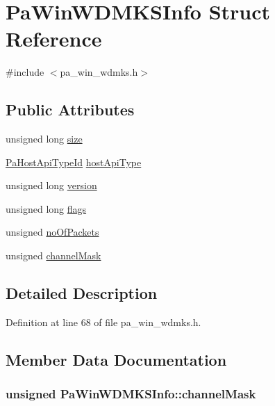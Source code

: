 \hypertarget{struct_pa_win_w_d_m_k_s_info}{}\section{Pa\+Win\+W\+D\+M\+K\+S\+Info Struct Reference}
\label{struct_pa_win_w_d_m_k_s_info}


{\ttfamily \#include $<$pa\+\_\+win\+\_\+wdmks.\+h$>$}

\subsection*{Public Attributes}
\begin{DoxyCompactItemize}
\item 
unsigned long \hyperlink{struct_pa_win_w_d_m_k_s_info_a550f4ab63732471599e64a2961a63125}{size}
\item 
\hyperlink{portaudio_8h_a8eaebe3d39c5ea45598da8f86dc2e5ae}{Pa\+Host\+Api\+Type\+Id} \hyperlink{struct_pa_win_w_d_m_k_s_info_a28bff7039063cc48ebab4e13cd1bf3c7}{host\+Api\+Type}
\item 
unsigned long \hyperlink{struct_pa_win_w_d_m_k_s_info_a17221c5458a73c0295dff5cef739eb7d}{version}
\item 
unsigned long \hyperlink{struct_pa_win_w_d_m_k_s_info_a2c46387aee219e1499120b056d74e94d}{flags}
\item 
unsigned \hyperlink{struct_pa_win_w_d_m_k_s_info_af1a2e073583ac238a60f1acbee470e28}{no\+Of\+Packets}
\item 
unsigned \hyperlink{struct_pa_win_w_d_m_k_s_info_a07cee1fc3c28bbf431672040b4256f5c}{channel\+Mask}
\end{DoxyCompactItemize}


\subsection{Detailed Description}


Definition at line 68 of file pa\+\_\+win\+\_\+wdmks.\+h.



\subsection{Member Data Documentation}
\subsubsection[{\texorpdfstring{channel\+Mask}{channelMask}}]{\setlength{\rightskip}{0pt plus 5cm}unsigned Pa\+Win\+W\+D\+M\+K\+S\+Info\+::channel\+Mask}\hypertarget{struct_pa_win_w_d_m_k_s_info_a07cee1fc3c28bbf431672040b4256f5c}{}\label{struct_pa_win_w_d_m_k_s_info_a07cee1fc3c28bbf431672040b4256f5c}


